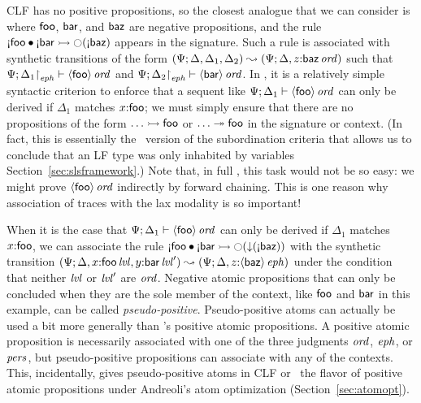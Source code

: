 CLF has no positive propositions, so the closest analogue that we can
consider is where ${\sf foo}$, ${\sf bar}$, and ${\sf baz}$ are
negative propositions, and the rule ${\gnab}{\sf foo} \fuse
{\gnab}{\sf bar} \lefti \ocircle({\gnab}{\sf baz})$ appears in the
signature. Such a rule is associated with synthetic transitions of the
form
%
$(\Psi; {\Delta},{{\Delta_1},{\Delta_2}}) \leadsto
(\Psi; {\Delta},{z{:}{{\sf baz}}\,{{\it ord}}})$ such that
${\Psi};{{\Delta_1}{\upharpoonright}_{{\it eph}}} \vdash {{\langle {\sf foo} \rangle}\,{{\it ord}}} \mathstrut$
and ${\Psi};{{\Delta_2}{\upharpoonright}_{{\it eph}}} \vdash {{\langle {\sf
      bar} \rangle}\,{{\it ord}}} \mathstrut$. In \sls, it is a relatively simple syntactic criterion
to enforce that a sequent like ${\Psi};{\Delta_1} \vdash {{\langle {\sf
      foo} \rangle}\,{{\it ord}}} \mathstrut$ can only be derived if $\Delta_1$ matches
$x{:}\sf{foo}$; we must simply ensure that there are no propositions
of the form $\ldots \rightarrowtail {\sf foo}$ or $\ldots \twoheadrightarrow {\sf foo}$ in
the signature or context. (In fact, this is essentially the
\sls~version of the subordination criteria that allows us to conclude
that an LF type was only inhabited by variables
Section~\ref{sec:slsframework}.)  Note that, in full \ollll, this task
would not be so easy: we might prove ${\langle {\sf foo} \rangle}\,{{\it ord}}$
indirectly by forward chaining. This is one reason why association of
traces with the lax modality is so important!

When it is the case that  ${\Psi};{\Delta_1} \vdash {{\langle {\sf
      foo} \rangle}\,{{\it ord}}} \mathstrut$ can only be derived if $\Delta_1$ matches
$x{:}\sf{foo}$, we can
associate the rule ${\gnab}{\sf foo} \fuse
{\gnab}{\sf bar} \lefti \ocircle({\downarrow}({\gnab}{\sf baz}))$
with the synthetic transition $(\Psi;
{\Delta},{{x{:}{{\sf foo}\,{{\it lvl}}}},{y{:}{{\sf
        bar}\,{{\it lvl}}'}}}) \leadsto (\Psi; {\Delta},{z{:}{\langle {\sf
      baz} \rangle}\,{{\it eph}}})$ under the condition that neither ${\it lvl}$ or ${\it lvl}'$
are ${\it ord}$.
Negative atomic propositions that can only be concluded when they are
the sole member of the context, like ${\sf foo}$ and ${\sf bar}$ in
this example, can be called {\it
  pseudo-positive}. Pseudo-positive atoms can actually be used a bit
more generally than \sls's positive atomic propositions. A positive
atomic proposition is necessarily associated with one of the three
judgments ${\it ord}$, ${\it eph}$, or ${\it pers}$, but pseudo-positive
propositions can associate with any of the contexts. This,
incidentally, gives pseudo-positive atoms in CLF or \sls~the flavor of
positive atomic propositions under Andreoli's atom optimization
(Section~\ref{sec:atomopt}).

